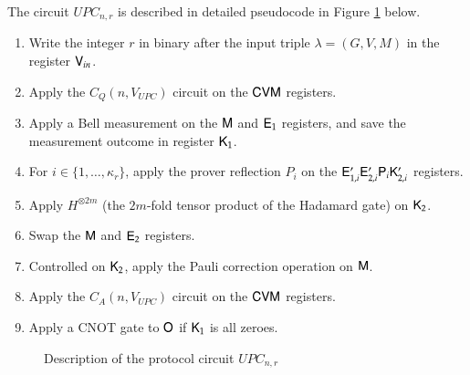 The circuit $UPC_{n,r}$ is described in detailed pseudocode in Figure \ref{fig:upc} below.

\begin{center}
\begin{mdframed}
	\begin{enumerate}
		\item Write the integer $r$ in binary after the input triple $\lambda = (G,V,M)$ in the register ${\mathsf{V}}_{in}$.
		\item Apply the $C_Q(n,V_{UPC})$ circuit on the ${\mathsf{C}} {\mathsf{V}} {\mathsf{M}}$ registers.
    \item Apply a Bell measurement on the ${\mathsf{M}}$ and ${\mathsf{E}}_1$ registers, and save the measurement outcome in register ${\mathsf{K}}_1$.
    \item For $i \in \{1,\ldots,\kappa_r\}$, apply the prover reflection $P_i$ on the ${\mathsf{E}}_{1,i}' {\mathsf{E}}_{2,i}' {\mathsf{P}}_i {\mathsf{K}}_{2,i}'$ registers.
    \item Apply $H^{\otimes 2m}$ (the $2m$-fold tensor product of the Hadamard gate) on ${\mathsf{K}}_2$. 
    \item Swap the ${\mathsf{M}}$ and ${\mathsf{E}}_2$ registers.
    \item Controlled on ${\mathsf{K}}_2$, apply the Pauli correction operation on ${\mathsf{M}}$.
    \item Apply the $C_A(n,V_{UPC})$ circuit on the ${\mathsf{C}} {\mathsf{V}} {\mathsf{M}}$ registers.
    \item Apply a CNOT gate to ${\mathsf{O}}$ if ${\mathsf{K}}_1$ is all zeroes.
    \end{enumerate}
\end{mdframed}
\begin{figure}[H]
\caption{Description of the protocol circuit \textsc{$UPC_{n,r}$}}
\label{fig:upc}
\end{figure}
\end{center}







